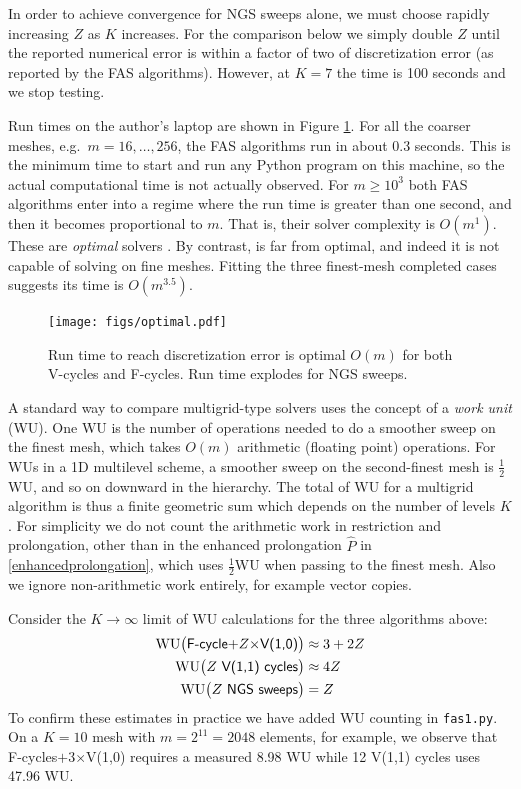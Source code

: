 \documentclass[letterpaper,final,12pt,reqno]{amsart}
\begin{document}
\medskip
In order to achieve convergence for NGS sweeps alone, we must choose rapidly increasing $Z$ as $K$ increases.  For the comparison below we simply double $Z$ until the reported numerical error is within a factor of two of discretization error (as reported by the FAS algorithms).  However, at $K=7$ the time is 100 seconds and we stop testing.

Run times on the author's laptop are shown in Figure \ref{fig:optimal}.  For all the coarser meshes, e.g.~$m=16,\dots,256$, the FAS algorithms run in about 0.3 seconds.  This is the minimum time to start and run any Python program on this machine, so the actual computational time is not actually observed.  For $m \ge 10^3$ both FAS algorithms enter into a regime where the run time is greater than one second, and then it becomes proportional to $m$.  That is, their solver complexity is $O(m^1)$.  These are \emph{optimal} solvers \cite[Chapter 7]{Bueler2021}.  By contrast,  is far from optimal, and indeed it is not capable of solving on fine meshes.  Fitting the three finest-mesh completed cases suggests its time is $O(m^{3.5})$.

\begin{figure}
\texttt{[image: figs/optimal.pdf]}
\caption{Run time to reach discretization error is optimal $O(m)$ for both V-cycles and F-cycles.  Run time explodes for NGS sweeps.}
\label{fig:optimal}
\end{figure}

A standard way to compare multigrid-type solvers uses the concept of a \emph{work unit} (WU).  One WU is the number of operations needed to do a smoother sweep on the finest mesh, which takes $O(m)$ arithmetic (floating point) operations.  For WUs in a 1D multilevel scheme, a smoother sweep on the second-finest mesh is $\frac{1}{2}$WU, and so on downward in the hierarchy.  The total of WU for a multigrid algorithm is thus a finite geometric sum \cite{Briggsetal2000} which depends on the number of levels $K$.  For simplicity we do not count the arithmetic work in restriction and prolongation, other than in the enhanced prolongation $\hat P$ in \eqref{enhancedprolongation}, which uses $\frac{1}{2}$WU when passing to the finest mesh.  Also we ignore non-arithmetic work entirely, for example vector copies.

Consider the $K\to\infty$ limit of WU calculations for the three algorithms above:
\begin{align*}
\text{WU}\big(\text{\textsf{F-cycle$+Z\times$V(1,0)}}\big) &\approx 3+2Z \\
\text{WU}\big(\text{\textsf{$Z$ V(1,1) cycles}}\big)   &\approx 4Z \\
\text{WU}\big(\text{\textsf{$Z$ NGS sweeps}}\big)      &= Z
\end{align*}
To confirm these estimates in practice we have added WU counting in \texttt{fas1.py}.  On a $K=10$ mesh with $m=2^{11}=2048$ elements, for example, we observe that \textsf{F-cycles$+$3$\times$V(1,0)} requires a measured 8.98 WU while \textsf{12 V(1,1) cycles} uses 47.96 WU.
\end{document}
